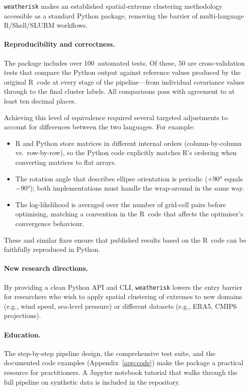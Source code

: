 \documentclass[preprint,12pt,a4paper]{elsarticle}
\begin{document}
\texttt{weatherisk} makes an established spatial-extreme clustering
methodology accessible as a standard Python package, removing
the barrier of multi-language R/Shell/SLURM workflows.

\paragraph{Reproducibility and correctness.}
The package includes over 100~automated tests.  Of these, 50 are
cross-validation tests that compare the Python output against
reference values produced by the original R~code at every stage of
the pipeline---from individual covariance values through to the
final cluster labels.  All comparisons pass with agreement to
at least ten decimal places.

Achieving this level of equivalence required several targeted
adjustments to account for differences between the two languages.
For example:
\begin{itemize}
\item R and Python store matrices in different internal orders
  (column-by-column vs.\ row-by-row), so the Python code explicitly
  matches R's ordering when converting matrices to flat arrays.
\item The rotation angle that describes ellipse orientation is
  periodic ($+90°$ equals $-90°$); both implementations must
  handle the wrap-around in the same way.
\item The log-likelihood is averaged over the number of grid-cell
  pairs before optimising, matching a convention in the R~code
  that affects the optimiser's convergence behaviour.
\end{itemize}
These and similar fixes ensure that published results based on
the R~code can be faithfully reproduced in Python.

\paragraph{New research directions.}
By providing a clean Python API and CLI, \texttt{weatherisk} lowers
the entry barrier for researchers who wish to apply spatial
clustering of extremes to new domains (e.g., wind speed, sea-level
pressure) or different datasets (e.g., ERA5, CMIP6 projections).


\paragraph{Education.}
The step-by-step pipeline design, the comprehensive test suite,
and the documented code examples (Appendix~\ref{app:code}) make
the package a practical resource for practitioners.  A Jupyter notebook tutorial
that walks through the full pipeline on synthetic data is
included in the repository.
\end{document}
